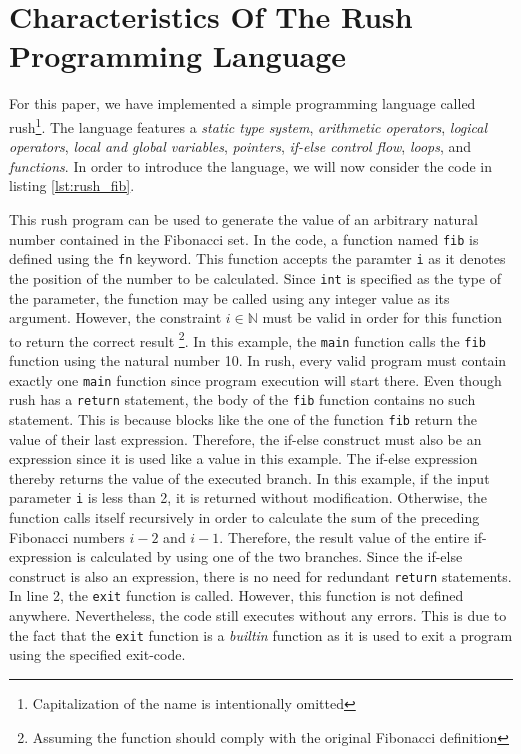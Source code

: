 \newpage
\section{Characteristics Of The Rush Programming Language}

For this paper, we have implemented a simple programming language called rush\footnote{Capitalization of the name is intentionally omitted}.
The language features a \emph{static type system}, \emph{arithmetic operators}, \emph{logical operators}, \emph{local and global variables}, \emph{pointers}, \emph{if-else control flow}, \emph{loops}, and \emph{functions}.
In order to introduce the language, we will now consider the code in listing \ref{lst:rush_fib}.


This rush program can be used to generate the value of an arbitrary natural number contained in the Fibonacci set.
In the code, a function named \texttt{fib} is defined using the \texttt{fn} keyword.
This function accepts the paramter \texttt{i} as it denotes the position of the number to be calculated.
Since \texttt{int} is specified as the type of the parameter, the function may be called using any integer value as its argument.
However, the constraint $i \in \mathbb{N}$ must be valid in order for this function to return the correct result \footnote{Assuming the function should comply with the original Fibonacci definition}.
In this example, the \texttt{main} function calls the \texttt{fib} function using the natural number 10.
In rush, every valid program must contain exactly one \texttt{main} function since program execution will start there.
Even though rush has a \texttt{return} statement, the body of the \texttt{fib} function contains no such statement.
This is because blocks like the one of the function \texttt{fib} return the value of their last expression.
Therefore, the if-else construct must also be an expression since it is used like a value in this example.
The if-else expression thereby returns the value of the executed branch.
In this example, if the input parameter \texttt{i} is less than 2, it is returned without modification.
Otherwise, the function calls itself recursively in order to calculate the sum of the preceding Fibonacci numbers $i - 2$ and $i - 1$.
Therefore, the result value of the entire if-expression is calculated by using one of the two branches.
Since the if-else construct is also an expression, there is no need for redundant \texttt{return} statements.
In line 2, the \texttt{exit} function is called.
However, this function is not defined anywhere.
Nevertheless, the code still executes without any errors.
This is due to the fact that the \texttt{exit} function is a \emph{builtin} function as it is used to exit a program using the specified exit-code.

